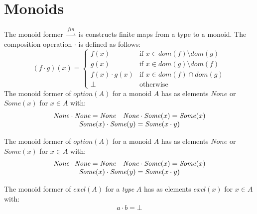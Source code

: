 \documentclass[nocopyrightspace]{sigplanconf}
\newcommand{\dom}{\mathit{dom}}
\newcommand{\None}{\mathit{None}}
\newcommand{\Some}{\mathit{Some}}
\newcommand{\option}{\mathit{option}}
\newcommand{\excl}{\mathit{excl}}
\newcommand{\finmap}{\overset{\mathit{fin}}{\rightharpoonup}}
\begin{document}
\appendix
\section{Monoids}
The monoid former $\finmap$ is constructs finite maps from a type to a monoid.
The composition operation $\cdot$ is defined as follows:
\[
(f \cdot g) (x) = \left\{
\begin{array}{ll}
f(x) & \text{if } x \in \dom(f)\setminus\dom(g)\\
g(x) & \text{if } x \in \dom(g)\setminus\dom(f)\\
f(x) \cdot g(x) & \text{if } x \in \dom(f)\cap\dom(g)\\
\bot & \text{otherwise}
\end{array}
\right.
\]
The monoid former of $\option(A)$ for a monoid $A$ has as elements 
$\None$ or $\Some(x)$ for $x \in A$ with:
\[
\begin{array}{ll}
\None \cdot \None = \None & \None \cdot \Some(x) = \Some(x) \\
\multicolumn{2}{c}{\Some(x) \cdot \Some(y) = \Some(x \cdot y)}
\end{array}
\]

The monoid former of $\option(A)$ for a monoid $A$ has as elements 
$\None$ or $\Some(x)$ for $x \in A$ with:
\[
\begin{array}{ll}
\None \cdot \None = \None & \None \cdot \Some(x) = \Some(x) \\
\multicolumn{2}{c}{\Some(x) \cdot \Some(y) = \Some(x \cdot y)}
\end{array}
\]

The monoid former of $\excl(A)$ for a \emph{type} $A$ has as elements 
$\excl(x)$ for $x \in A$ with:
\[
\begin{array}{ll}
a \cdot b = \bot
\end{array}
\]
\end{document}
